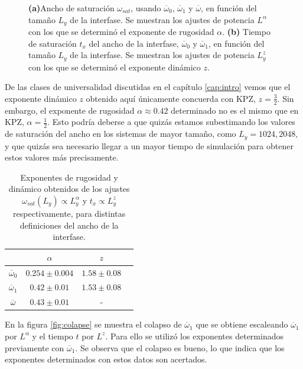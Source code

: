 \begin{figure}[!b]
\begin{subfigure}{.57\textwidth}
      \caption{}
    \end{subfigure}
    \caption{\textbf{(a)}Ancho de saturación $\omega_{sat}$, usando $\overline{\omega}_0$, $\overline{\omega}_1$ y $\overline{\omega}$, en función del tamaño $L_y$ de la interfase. Se muestran los ajustes de potencia $L^\alpha$ con los que se determinó el exponente de rugosidad $\alpha$. \textbf{(b)} Tiempo de saturación $t_x$ del ancho de la interfase, $\overline{\omega}_0$ y $\overline{\omega}_1$, en función del tamaño $L_y$ de la interfase. Se muestran los ajustes de potencia $L_y^z$ con los que se determinó el exponente dinámico $z$.}
    \label{fig:omega_txvsL}
\end{figure}


De las clases de universalidad discutidas en el capítulo \ref{cap:intro} vemos que el exponente dinámico $z$ obtenido aquí únicamente concuerda con KPZ, $z = \frac{3}{2}$. Sin embargo, el exponente de rugosidad $\alpha\approx 0.42$ determinado no es el mismo que en KPZ, $\alpha = \frac{1}{2}$. Esto podría deberse a que quizás estamos subestimando los valores de saturación del ancho en los sistemas de mayor tamaño, como $L_y = 1024,2048$, y que quizás sea necesario llegar a un mayor tiempo de simulación para obtener estos valores más precisamente.

\begin{table}[t]
    \centering
    \begin{tabular}{@{}cccc@{}}
    \toprule
     & $\alpha$     & $z$    \\ \midrule
    $\overline{\omega}_0$     & $0.254\pm0.004$ & $1.58 \pm 0.08$ \\
    $\overline{\omega}_1$    & $0.42\pm0.01$ & $1.53 \pm 0.08$ \\
    $\overline{\omega}  $  & $0.43\pm0.01$ & - \\
    \end{tabular}
    \caption{Exponentes de rugosidad y dinámico obtenidos de los ajustes $\omega_{sat}(L_y) \propto L_y^{\alpha}$ y $t_x \propto L_y^z$ respectivamente, para distintas definiciones del ancho de la interfase.}
    \label{tab:exponentes}
\end{table}

En la figura \ref{fig:colapse} se muestra el colapso de $\overline{\omega}_1$ que se obtiene escaleando $\overline{\omega}_1$ por $L^\alpha$ y el tiempo $t$ por $L^z$. Para ello se utilizó los exponentes determinados previamente con $\overline{\omega}_1$. Se observa que el colapso es bueno, lo que indica que los exponentes determinados con estos datos son acertados.

